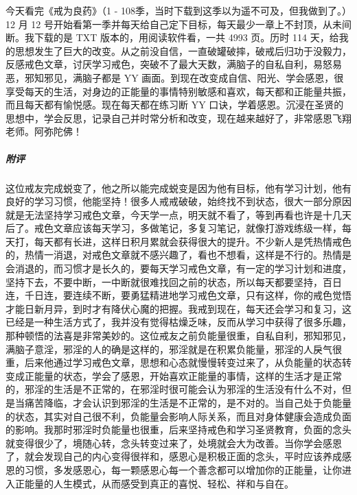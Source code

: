 \begin{case}
    今天看完《戒为良药》（1 - 108季，当时下载到这季以为遥不可及，但我做到了。）12 月 12 号开始看第一季并每天给自己定下目标，每天最少一章上不封顶，从未间断。我下载的是 TXT 版本的，用阅读软件看，一共 4993 页。历时 114 天，给我的思想发生了巨大的改变。从之前没自信，一直破罐破摔，破戒后归功于没毅力，反感戒色文章，讨厌学习戒色，突破不了最大天数，满脑子的自私自利，易怒易恶，邪知邪见，满脑子都是 YY 画面。到现在改变成自信、阳光、学会感恩，很享受每天的生活，对身边的正能量的事情特别敏感和喜欢，每天都和正能量共振，而且每天都有愉悦感。现在每天都在练习断 YY 口诀，学着感恩。沉浸在圣贤的思想中，学会反思，记录自己并时常分析和改变，现在越来越好了，非常感恩飞翔老师。阿弥陀佛！
    \subparagraph{附评} 这位戒友完成蜕变了，他之所以能完成蜕变是因为他有目标，他有学习计划，他有良好的学习习惯，他能坚持！很多人戒戒破破，始终找不到状态，很大一部分原因就是无法坚持学习戒色文章，今天学一点，明天就不看了，等到再看也许是十几天后了。戒色文章应该每天学习，多做笔记，多复习笔记，就像打游戏练级一样，每天打，每天都有长进，这样日积月累就会获得很大的提升。不少新人是凭热情戒色的，热情一消退，对戒色文章就不感兴趣了，看也不想看，这样是不行的。热情是会消退的，而习惯才是长久的，要每天学习戒色文章，有一定的学习计划和进度，坚持下去，不要中断，一中断就很难找回之前的状态，所以每天都要坚持，百日连，千日连，要连续不断，要勇猛精进地学习戒色文章，只有这样，你的戒色觉悟才能日新月异，到时才有降伏心魔的把握。我戒到现在，每天还会学习和复习，这已经是一种生活方式了，我并没有觉得枯燥乏味，反而从学习中获得了很多乐趣，那种顿悟的法喜是非常美妙的。这位戒友之前负能量很重，自私自利，邪知邪见，满脑子意淫，邪淫的人的确是这样的，邪淫就是在积累负能量，邪淫的人戾气很重，后来他通过学习戒色文章，思想和心态就慢慢转变过来了，从负能量的状态转变成正能量的状态，学会了感恩，开始喜欢正能量的事情，这样的生活才是正常的，邪淫的生活是不正常的，在邪淫时很可能会认为邪淫的生活没有什么不对，但是当痛苦降临，才会认识到邪淫的生活是不正常的，是不对的。当自己处于负能量的状态，其实对自己很不利，负能量会影响人际关系，而且对身体健康会造成负面的影响。我那时邪淫时负能量也很重，后来坚持戒色和学习圣贤教育，负面的念头就变得很少了，境随心转，念头转变过来了，处境就会大为改善。当你学会感恩了，就会发现自己的内心变得很祥和，感恩心是积极正面的念头，平时应该养成感恩的习惯，多发感恩心，每一颗感恩心每一个善念都可以增加你的正能量，让你进入正能量的人生模式，从而感受到真正的喜悦、轻松、祥和与自在。
\end{case}


